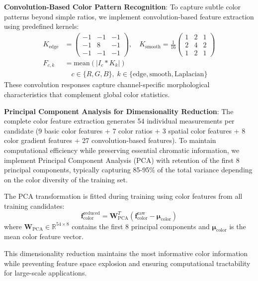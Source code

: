 \documentclass[twocolumn,10pt]{aastex631}
\begin{document}
\textbf{Convolution-Based Color Pattern Recognition}: To capture subtle color patterns beyond simple ratios, we implement convolution-based feature extraction using predefined kernels:
\begin{align}
K_{\text{edge}} &= \begin{pmatrix} -1 & -1 & -1 \\ -1 & 8 & -1 \\ -1 & -1 & -1 \end{pmatrix}, \quad 
K_{\text{smooth}} = \frac{1}{16}\begin{pmatrix} 1 & 2 & 1 \\ 2 & 4 & 2 \\ 1 & 2 & 1 \end{pmatrix} \\
F_{c,k} &= \text{mean}(|I_c * K_k|) \nonumber \\
&\quad c \in \{R,G,B\}, \; k \in \{\text{edge}, \text{smooth}, \text{Laplacian}\}
\end{align}
These convolution responses capture channel-specific morphological characteristics that complement global color statistics.

\textbf{Principal Component Analysis for Dimensionality Reduction}: The complete color feature extraction generates 54 individual measurements per candidate (9 basic color features + 7 color ratios + 3 spatial color features + 8 color gradient features + 27 convolution-based features). To maintain computational efficiency while preserving essential chromatic information, we implement Principal Component Analysis (PCA) with retention of the first 8 principal components, typically capturing 85-95\% of the total variance depending on the color diversity of the training set.

The PCA transformation is fitted during training using color features from all training candidates:
\begin{equation}
\mathbf{f}_{\text{color}}^{\text{reduced}} = \mathbf{W}_{\text{PCA}}^T (\mathbf{f}_{\text{color}}^{\text{raw}} - \boldsymbol{\mu}_{\text{color}})
\end{equation}
where $\mathbf{W}_{\text{PCA}} \in \mathbb{R}^{54 \times 8}$ contains the first 8 principal components and $\boldsymbol{\mu}_{\text{color}}$ is the mean color feature vector.

This dimensionality reduction maintains the most informative color information while preventing feature space explosion and ensuring computational tractability for large-scale applications.
\end{document}
